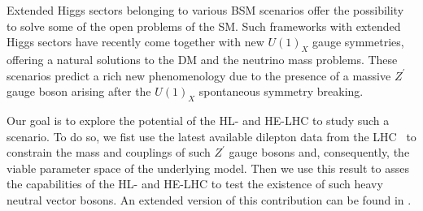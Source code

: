 Extended Higgs sectors belonging to various BSM scenarios 
offer the possibility to 
solve some of the open problems of the SM. Such frameworks with extended Higgs sectors have recently come together with new $U(1)_X$ gauge symmetries, offering a natural 
solutions to the DM and the neutrino mass problems.
These scenarios \cite{Ko:2013zsa,Ko:2014uka,Berlin:2014cfa,Huang:2015wts,DelleRose:2017xil,Campos:2017dgc} predict
a rich 
new phenomenology due to the presence of a massive $Z^\prime$ gauge 
boson arising after the $U(1)_X$ spontaneous symmetry breaking.
 
Our goal is to explore the potential of the HL- and HE-LHC to study such a scenario. To do so, we fist use the latest available dilepton data  
from the LHC~\cite{Aaboud:2017buh, Sirunyan:2018exx} to constrain the mass and couplings of such $Z^\prime$ gauge bosons and, consequently, the viable parameter space of the underlying model. Then we use this result to asses the capabilities of the HL- and HE-LHC to test the existence of such heavy neutral vector bosons. An extended version of this contribution can be found in .
 
